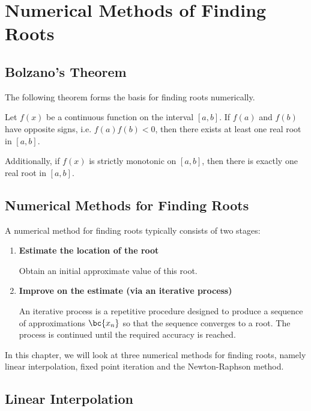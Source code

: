 \chapter{Numerical Methods of Finding Roots}

\section{Bolzano's Theorem}\label{S:Bolzano}

The following theorem forms the basis for finding roots numerically.

\begin{theorem}
    Let $f(x)$ be a continuous function on the interval $[a, b]$. If $f(a)$ and $f(b)$ have opposite signs, i.e. $f(a) f(b) < 0$, then there exists at least one real root in $[a, b]$.
\end{theorem}

Additionally, if $f(x)$ is strictly monotonic on $[a, b]$, then there is exactly one real root in $[a, b]$.

\section{Numerical Methods for Finding Roots}

A numerical method for finding roots typically consists of two stages:
\renewcommand{\theenumi}{\arabic{enumi}.}%
\begin{enumerate}
    \item \textbf{Estimate the location of the root}
    
    Obtain an initial approximate value of this root.
    \item \textbf{Improve on the estimate (via an iterative process)}

    An iterative process is a repetitive procedure designed to produce a sequence of approximations $\bc{x_n}$ so that the sequence converges to a root. The process is continued until the required accuracy is reached.
\end{enumerate}
\renewcommand{\theenumi}{(\alph{enumi})}

In this chapter, we will look at three numerical methods for finding roots, namely linear interpolation, fixed point iteration and the Newton-Raphson method.

\section{Linear Interpolation}

